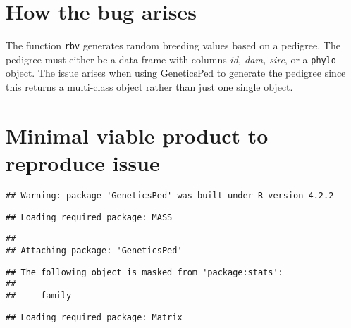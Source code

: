 \hypertarget{how-the-bug-arises}{%
\section*{How the bug arises}\label{how-the-bug-arises}}

The function \texttt{rbv} generates random breeding values based on a
pedigree. The pedigree must either be a data frame with columns
\emph{id, dam, sire}, or a \texttt{phylo} object. The issue arises when
using GeneticsPed to generate the pedigree since this returns a
multi-class object rather than just one single object.

\hypertarget{minimal-viable-product-to-reproduce-issue}{%
\section*{Minimal viable product to reproduce
issue}\label{minimal-viable-product-to-reproduce-issue}}

\begin{Shaded}
\begin{Highlighting}[]
\end{Highlighting}
\end{Shaded}

\begin{verbatim}
## Warning: package 'GeneticsPed' was built under R version 4.2.2
\end{verbatim}

\begin{verbatim}
## Loading required package: MASS
\end{verbatim}

\begin{verbatim}
## 
## Attaching package: 'GeneticsPed'
\end{verbatim}

\begin{verbatim}
## The following object is masked from 'package:stats':
## 
##     family
\end{verbatim}

\begin{Shaded}
\begin{Highlighting}[]
\end{Highlighting}
\end{Shaded}

\begin{verbatim}
## Loading required package: Matrix
\end{verbatim}

